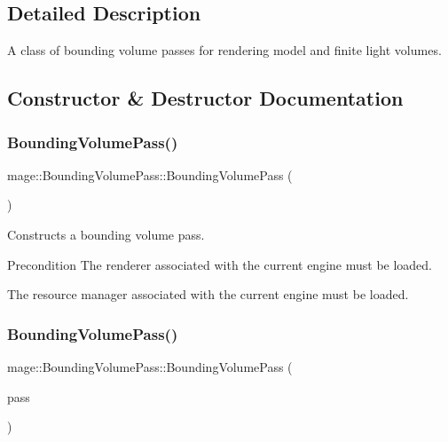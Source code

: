 \subsection{Detailed Description}
A class of bounding volume passes for rendering model and finite light volumes. 

\subsection{Constructor \& Destructor Documentation}
\hypertarget{classmage_1_1_bounding_volume_pass_ab32eb9086e463f5260f8999b78b55b26}{}\label{classmage_1_1_bounding_volume_pass_ab32eb9086e463f5260f8999b78b55b26} 
\subsubsection{\texorpdfstring{Bounding\+Volume\+Pass()}{BoundingVolumePass()}\hspace{0.1cm}{\footnotesize\ttfamily [1/3]}}
{\footnotesize\ttfamily mage\+::\+Bounding\+Volume\+Pass\+::\+Bounding\+Volume\+Pass (\begin{DoxyParamCaption}{ }\end{DoxyParamCaption})}

Constructs a bounding volume pass.

\begin{DoxyPrecond}{Precondition}
The renderer associated with the current engine must be loaded. 

The resource manager associated with the current engine must be loaded. 
\end{DoxyPrecond}
\hypertarget{classmage_1_1_bounding_volume_pass_a23b4f213c22b5649632dc51d2a0e91c1}{}\label{classmage_1_1_bounding_volume_pass_a23b4f213c22b5649632dc51d2a0e91c1} 
\subsubsection{\texorpdfstring{Bounding\+Volume\+Pass()}{BoundingVolumePass()}\hspace{0.1cm}{\footnotesize\ttfamily [2/3]}}
{\footnotesize\ttfamily mage\+::\+Bounding\+Volume\+Pass\+::\+Bounding\+Volume\+Pass (\begin{DoxyParamCaption}\item[{const \hyperlink{classmage_1_1_bounding_volume_pass}{Bounding\+Volume\+Pass} \&}]{pass }\end{DoxyParamCaption})\hspace{0.3cm}{\ttfamily [delete]}}

